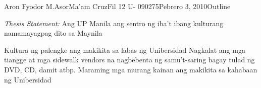 \documentclass[12pt,letterpaper]{article}
\begin{document}
\begin{mla}{Aron Fyodor M.}{Asor}{Ma'am Cruz}{Fil 12 U- 090275}{Pebrero 3, 2010}{Outline}

	\noindent\textit{Thesis Statement:} Ang UP Manila ang sentro ng iba't ibang kulturang
	namamayagpag dito sa Maynila

	\begin{outline}[enumerate]
			\1 Kultura ng palengke ang makikita sa labas ng Unibersidad
				\2 Nagkalat ang mga tiangge at mga sidewalk vendors na nagbebenta
				ng samu't-saring bagay tulad ng DVD, CD, damit atbp.
				\2 Maraming mga murang kainan ang makikita sa kahabaan
				ng Unibersidad
			\1 
	\end{outline}


\end{mla}
\end{document}
